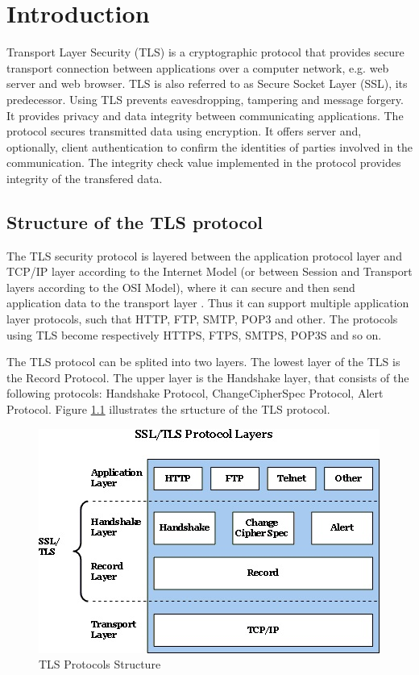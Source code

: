 \chapter{Introduction}
\label{chap:introduction}

Transport Layer Security (TLS) is a cryptographic protocol that provides secure transport connection between applications over a computer network, e.g. web server and web browser. TLS is also referred to as Secure Socket Layer (SSL), its predecessor. Using TLS prevents eavesdropping, tampering and message forgery. It provides privacy and data integrity between communicating applications. The protocol secures transmitted data using encryption. It offers server and, optionally, client authentication to confirm the identities of parties involved in the communication. The integrity check value implemented in the protocol provides integrity of the transfered data. \cite{RFC5246}

\section{Structure of the TLS protocol}
\label{sec:stucture}

The TLS security protocol is layered between the application protocol layer and TCP/IP layer according to the Internet Model (or between Session and Transport layers according to the OSI Model), where it can secure and then send application data to the transport layer \cite{ms:overview}. Thus it can support multiple application layer protocols, such that HTTP, FTP, SMTP, POP3 and other. The protocols using TLS become respectively HTTPS, FTPS, SMTPS, POP3S and so on.

The TLS protocol can be splited into two layers. The lowest layer of the TLS is the Record Protocol. The upper layer is the Handshake layer, that consists of the following protocols: Handshake Protocol, ChangeCipherSpec Protocol, Alert Protocol. Figure \ref{fig:tls_structure} illustrates the srtucture of the TLS protocol. 


\begin{figure}[H]
	\centering
		\includegraphics[scale=0.85]{images/tls_structure.jpg}
	\caption{TLS Protocols Structure \cite{ms:overview}}
	\label{fig:tls_structure}
\end{figure}

